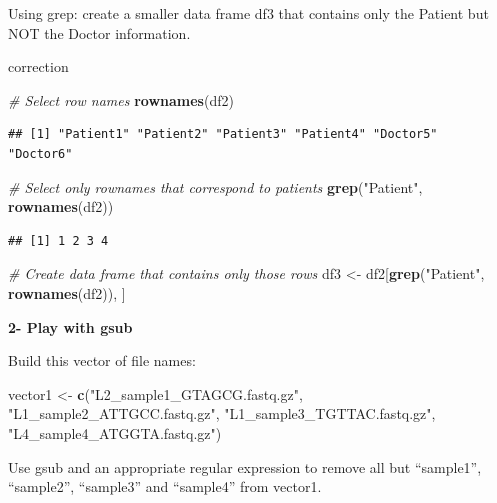 \documentclass[]{book}
\newenvironment{Shaded}{\begin{snugshade}}{\end{snugshade}}
\newcommand{\CommentTok}[1]{\textcolor[rgb]{0.56,0.35,0.01}{\textit{#1}}}
\newcommand{\KeywordTok}[1]{\textcolor[rgb]{0.13,0.29,0.53}{\textbf{#1}}}
\newcommand{\NormalTok}[1]{#1}
\newcommand{\StringTok}[1]{\textcolor[rgb]{0.31,0.60,0.02}{#1}}
\begin{document}
Using grep: create a smaller data frame df3 that contains only the Patient but NOT the Doctor information.

correction

\begin{Shaded}
\begin{Highlighting}[]
\CommentTok{# Select row names}
\KeywordTok{rownames}\NormalTok{(df2)}
\end{Highlighting}
\end{Shaded}

\begin{verbatim}
## [1] "Patient1" "Patient2" "Patient3" "Patient4" "Doctor5"  "Doctor6"
\end{verbatim}

\begin{Shaded}
\begin{Highlighting}[]
\CommentTok{# Select only rownames that correspond to patients}
\KeywordTok{grep}\NormalTok{(}\StringTok{"Patient"}\NormalTok{, }\KeywordTok{rownames}\NormalTok{(df2))}
\end{Highlighting}
\end{Shaded}

\begin{verbatim}
## [1] 1 2 3 4
\end{verbatim}

\begin{Shaded}
\begin{Highlighting}[]
\CommentTok{# Create data frame that contains only those rows}
\NormalTok{df3 <-}\StringTok{ }\NormalTok{df2[}\KeywordTok{grep}\NormalTok{(}\StringTok{"Patient"}\NormalTok{, }\KeywordTok{rownames}\NormalTok{(df2)), ]}
\end{Highlighting}
\end{Shaded}

\textbf{2- Play with gsub}

Build this vector of file names:

\begin{Shaded}
\begin{Highlighting}[]
\NormalTok{vector1 <-}\StringTok{ }\KeywordTok{c}\NormalTok{(}\StringTok{"L2_sample1_GTAGCG.fastq.gz"}\NormalTok{, }\StringTok{"L1_sample2_ATTGCC.fastq.gz"}\NormalTok{, }
    \StringTok{"L1_sample3_TGTTAC.fastq.gz"}\NormalTok{, }\StringTok{"L4_sample4_ATGGTA.fastq.gz"}\NormalTok{)}
\end{Highlighting}
\end{Shaded}

Use gsub and an appropriate regular expression to remove all but ``sample1'', ``sample2'', ``sample3'' and ``sample4'' from vector1.
\end{document}
